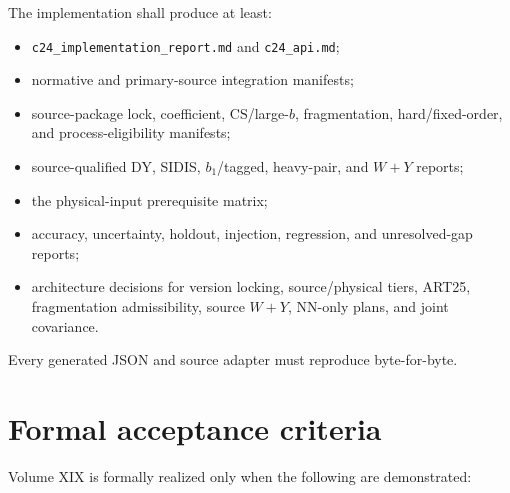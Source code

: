 \documentclass[11pt]{article}
\newcommand{\CS}{\ensuremath{\mathrm{CS}}}
\begin{document}
The implementation shall produce at least:
\begin{itemize}
\item \texttt{c24\_implementation\_report.md} and \texttt{c24\_api.md};
\item normative and primary-source integration manifests;
\item source-package lock, coefficient, \CS/large-\(b\), fragmentation, hard/fixed-order, and process-eligibility manifests;
\item source-qualified DY, SIDIS, \(b_1\)/tagged, heavy-pair, and \(W+Y\) reports;
\item the physical-input prerequisite matrix;
\item accuracy, uncertainty, holdout, injection, regression, and unresolved-gap reports;
\item architecture decisions for version locking, source/physical tiers, ART25, fragmentation admissibility, source \(W+Y\), NN-only plans, and joint covariance.
\end{itemize}

Every generated JSON and source adapter must reproduce byte-for-byte.

\section{Formal acceptance criteria}
\label{sec:acceptance}

Volume XIX is formally realized only when the following are demonstrated:
\end{document}
